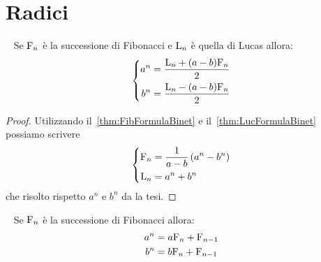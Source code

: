 \section{Radici}
\begin{thm}~\cite{Rabinowitz_1996}\label{thm:FibLucRimuoviab}
	Se $\mathrm{F}_{n}$ è la successione di Fibonacci e  $\mathrm{L}_{n}$ è quella di Lucas
	allora:\begin{equation}
		\left\{\begin{aligned}
			a^n={} & \dfrac{\mathrm{L}_{n}+(a-b)\mathrm{F}_{n}}{2} \\
			b^n={} & \dfrac{\mathrm{L}_{n}-(a-b)\mathrm{F}_{n}}{2} \\
		\end{aligned}
		\right.
	\end{equation}
\end{thm}
\begin{proof}
	Utilizzando il~\vref{thm:FibFormulaBinet} e il~\vref{thm:LucFormulaBinet}
	possiamo scrivere
	\begin{equation*}
		\left\{
		\begin{aligned}
			\mathrm{F}_{n}={} & \dfrac{1}{a-b}\left(a^n-b^n\right) \\
			\mathrm{L}_{n}={} & a^n+b^n
		\end{aligned}
		\right.
	\end{equation*}
	che risolto rispetto $a^n$ e $b^n$ da la tesi.
\end{proof}
\begin{thm}[Potenze di a e 	b]~\cite{Rabinowitz_1996}
	\label{thm:FibRimuovipotab
	}
	Se $\mathrm{F}_{n}$ è la successione di Fibonacci allora:
	\begin{align*}
		a^n={} & a\mathrm{F}_{n}+\mathrm{F}_{n-1} \\
		b^n={} & b\mathrm{F}_{n}+\mathrm{F}_{n-1} \\
	\end{align*}
\end{thm}
